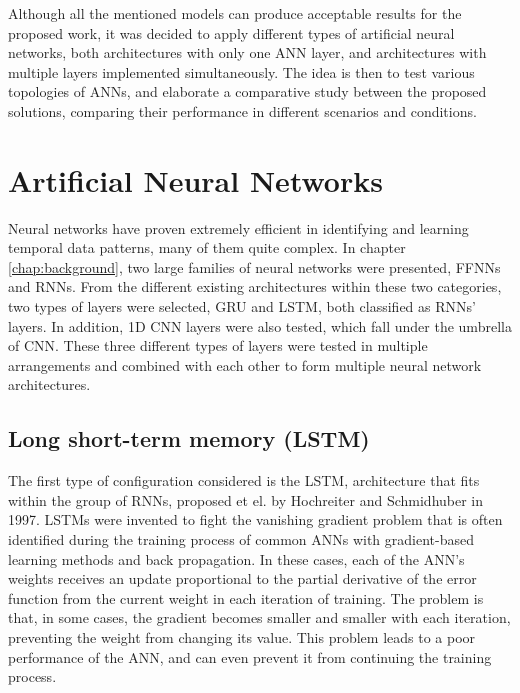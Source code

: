 Although all the mentioned models can produce acceptable results for the proposed work, it was decided to apply different types of artificial neural networks, both architectures with only one \ac{ANN} layer, and architectures with multiple layers implemented simultaneously. The idea is then to test various topologies of \ac{ANN}s, and elaborate a comparative study between the proposed solutions, comparing their performance in different scenarios and conditions.



\section{Artificial Neural Networks}\label{sec:layers}

Neural networks have proven extremely efficient in identifying and learning temporal data patterns, many of them quite complex. In chapter \ref{chap:background}, two large families of neural networks were presented, \ac{FFNN}s and \ac{RNN}s. From the different existing architectures within these two categories, two types of layers were selected, \ac{GRU} and \ac{LSTM}, both classified as \ac{RNN}s' layers. In addition, \ac{1D CNN} layers were also tested, which fall under the umbrella of \ac{CNN}. These three different types of layers were tested in multiple arrangements and combined with each other to form multiple neural network architectures.


\subsection{Long short-term memory (LSTM)}

The first type of configuration considered is the \ac{LSTM}, architecture that fits within the group of \ac{RNN}s, proposed et el. \cite{lstm0} by Hochreiter and Schmidhuber in 1997.
\ac{LSTM}s were invented to fight the vanishing gradient problem that is often identified during the training process of common \ac{ANN}s with gradient-based learning methods and back propagation. In these cases, each of the \ac{ANN}'s weights receives an update proportional to the partial derivative of the error function from the current weight in each iteration of training. The problem is that, in some cases, the gradient becomes smaller and smaller with each iteration, preventing the weight from changing its value. This problem leads to a poor performance of the \ac{ANN}, and can even prevent it from continuing the training process.

